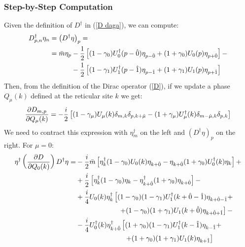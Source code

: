 \subsubsection*{Step-by-Step Computation}
Given the definition of $D^\dagger$ in (\ref{D daga}), we can compute: 
\begin{equation}\label{ddagger eta}
\begin{split}
        D^\dagger_{p,n} \eta_n &= \left(D^\dagger \eta \right)_p = \\
        & = \Bar{m} \eta_p - \frac{1}{2}\left[ (1 - \gamma_0) U_0^\dagger(p - \hat{0}) \eta_{p-\hat{0}} + (1 + \gamma_0) U_0 (p) \eta_{p+\hat{0}} \right] - \\
        & \,\,\,\,\,\,\,\,\,\,\, \,\,\,\,\,\,\, \, - \frac{1}{2}\left[ (1 - \gamma_1) U_1^\dagger(p - \hat{1}) \eta_{p-\hat{1}} + (1 + \gamma_1) U_1 (p) \eta_{p + \hat{1}}\right]
\end{split}
\end{equation} 
Then, from the definition of the Dirac operator (\ref{D}), if we update a phase $Q_\mu (k)$ defined at the reticular site $k$ we get:
\begin{equation}\label{deriv D}
    \pdv{D_{m,p}}{Q_\mu(k)} = - \frac{i}{2} \left[ (1 - \gamma_\mu)U_\mu(k) \delta_{m,k} \delta_{p, k + \hat{\mu}} - (1 + \gamma_\mu) U_\mu^\dagger(k)\delta_{m - \hat{\mu}, k} \delta_{p, k}  \right]
\end{equation}
We need to contract this expression with $\eta^\dagger_m$ on the left and $(D^\dagger \eta)_p$ on the right.
For $\mu = 0$:
\begin{equation}\label{force0}
    \begin{split}
        \eta^\dagger \left( \pdv{D}{Q_0(k)} \right) D^\dagger \eta = &- \frac{i}{2} \Bar{m} \left[ \eta^\dagger_k (1 - \gamma_0) U_0 (k) \eta_{k + \hat{0}} - \eta_{k + \hat{0}} (1 + \gamma_0) U_0^\dagger(k)\eta_k \right] + \\
         & + \frac{i}{2} \left[ \eta^\dagger_k (1 - \gamma_0) \eta_k - \eta^\dagger_{k + \hat{0}} (1 + \gamma_0) \eta_{k + \hat{0}} \right] - \\
        & + \frac{i}{4} U_0(k) \eta_k^\dagger \left[ (1-\gamma_0)(1 - \gamma_1) U_1^\dagger(k + \hat{0} - \hat{1}) \eta_{k + \hat{0} -\hat{1}} + \right.  \\ 
        & \,\,\,\,\,\,\,\,\,\,\,\,\,\,\,\,\,\,\,\,\,\,\,\,\,\,\,\,\,\,\,\,\,\,\,\,\, \left. + (1 - \gamma_0)(1 + \gamma_1) U_1 (k + \hat{0}) \eta_{k + \hat{0} + \hat{1}} \right] - \\
        & - \frac{i}{4} U_0^\dagger(k) \eta_{k + \hat{0}}^\dagger \left[(1+\gamma_0)(1 - \gamma_1) U_1^\dagger(k-\hat{1}) \eta_{k - \hat{1}} +  \right. \\
        & \,\,\,\,\,\,\,\,\,\,\,\,\,\,\,\,\,\,\,\,\,\,\,\,\,\,\,\,\,\,\,\,\,\,\,\,\,\,\,\,\,\, \left. + (1 + \gamma_0)(1 + \gamma_1) U_1 (k) \eta_{k + \hat{1}} \right]
    \end{split}
\end{equation}
